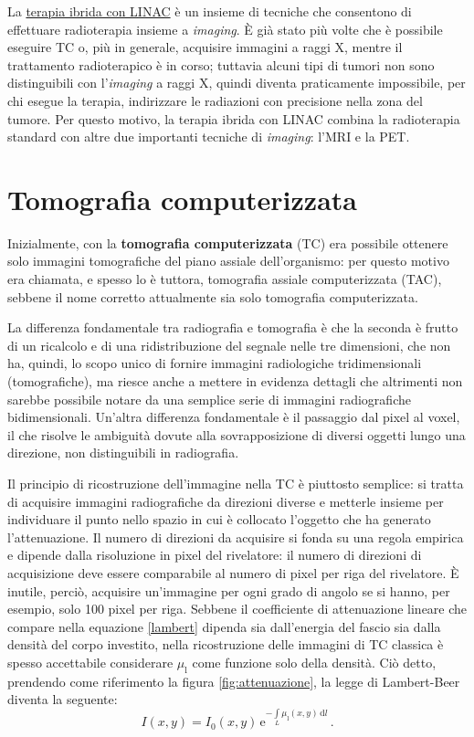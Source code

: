 \documentclass{report}
\newcommand{\figref}[1]{figura \ref{#1}}
\renewcommand{\eqref}[1]{equazione \ref{#1}}
\numberwithin{equation}{section}
\numberwithin{figure}{section}
\begin{document}
La \underline{terapia ibrida con LINAC} è un insieme di tecniche che consentono di effettuare radioterapia insieme a \textit{imaging}. È già stato più volte che è possibile eseguire TC o, più in generale, acquisire immagini a raggi X, mentre il trattamento radioterapico è in corso; tuttavia alcuni tipi di tumori non sono distinguibili con l'\textit{imaging} a raggi X, quindi diventa praticamente impossibile, per chi esegue la terapia, indirizzare le radiazioni con precisione nella zona del tumore. Per questo motivo, la terapia ibrida con LINAC combina la radioterapia standard con altre due importanti tecniche di \textit{imaging}: l'MRI e la PET.

\section{Tomografia computerizzata}
Inizialmente, con la \textbf{tomografia computerizzata} (TC) era possibile ottenere solo immagini tomografiche del piano assiale dell'organismo: per questo motivo era chiamata, e spesso lo è tuttora, tomografia assiale computerizzata (TAC), sebbene il nome corretto attualmente sia solo tomografia computerizzata.

La differenza fondamentale tra radiografia e tomografia è che la seconda è frutto di un ricalcolo e di una ridistribuzione del segnale nelle tre dimensioni, che non ha, quindi, lo scopo unico di fornire immagini radiologiche tridimensionali (tomografiche), ma riesce anche a mettere in evidenza dettagli che altrimenti non sarebbe possibile notare da una semplice serie di immagini radiografiche bidimensionali. Un'altra differenza fondamentale è il passaggio dal pixel al voxel, il che risolve le ambiguità dovute alla sovrapposizione di diversi oggetti lungo una direzione, non distinguibili in radiografia.

Il principio di ricostruzione dell'immagine nella TC è piuttosto semplice: si tratta di acquisire immagini radiografiche da direzioni diverse e metterle insieme per individuare il punto nello spazio in cui è collocato l'oggetto che ha generato l'attenuazione. Il numero di direzioni da acquisire si fonda su una regola empirica e dipende dalla risoluzione in pixel del rivelatore: il numero di direzioni di acquisizione deve essere comparabile al numero di pixel per riga del rivelatore. È inutile, perciò, acquisire un'immagine per ogni grado di angolo se si hanno, per esempio, solo 100 pixel per riga. Sebbene il coefficiente di attenuazione lineare che compare nella \eqref{lambert} dipenda sia dall'energia del fascio sia dalla densità del corpo investito, nella ricostruzione delle immagini di TC classica è spesso accettabile considerare $\mu_\mathrm{l}$ come funzione solo della densità. Ciò detto, prendendo come riferimento la \figref{fig:attenuazione}, la legge di Lambert-Beer diventa la seguente:
\begin{equation}
    I(x,y) = I_0(x,y)\,\mathrm{e}^{-\int\limits_L \mu_\mathrm{l} (x,y)\,\mathrm{d}l}\,.
\end{equation}
\end{document}
